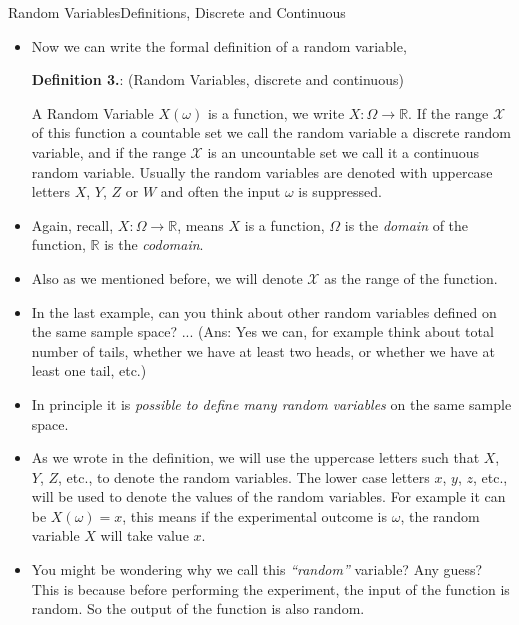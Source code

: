 \documentclass[8pt, usepdftitle=false]{beamer}
\newcounter{mytheorem}
\renewcommand{\themytheorem}{3.\arabic{mytheorem}}
\newcommand{\Thm}[1]{\refstepcounter{mytheorem}\textbf{#1\color{blue}\themytheorem}:}
\begin{document}
\begin{frame}[allowframebreaks]{Random Variables}{Definitions, Discrete and Continuous}
\begin{itemize}
\item Now we can write the formal definition of a random variable,

\begin{varblock}{\Thm{Definition } (Random Variables, discrete and continuous)}

A Random Variable $X(\omega)$ is a function, we write $X:\Omega \to \mathbb{R}$. If the range $\mathcal{X}$ of this function a countable set we call the random variable \alert{a discrete random variable}, and if the range $\mathcal{X}$ is an uncountable set we call it \alert{a continuous random variable}. Usually the random variables are denoted with uppercase letters $X$, $Y$, $Z$ or $W$ and often the input $\omega$ is  suppressed. 
\end{varblock}



\item Again, recall, $X: \Omega \to \mathbb{R}$, means $X$ is a function, $\Omega$ is the \emph{domain} of the function, $\mathbb{R}$ is the \emph{codomain}. 

\item Also as we mentioned before, we will denote $\mathcal{X}$ as the range of the function. 


\framebreak

\item In the last example, can you think about other random variables defined on the same sample space? ... (Ans: Yes we can, for example think about total number of tails, whether we have at least two heads, or whether we have at least one tail, etc.)


\item In principle it is \emph{possible to define many random variables} on the same sample space.

\item As we wrote in the definition, we will use the uppercase letters such that $X$, $Y$, $Z$, etc., to denote the random variables. The lower case letters $x$, $y$, $z$, etc., will be used to denote the values of the random variables. For example it can be $X(\omega) = x$, this means if the experimental outcome is $\omega$, the random variable $X$ will take value $x$.

\item You might be wondering why we call this \emph{``random''} variable? Any guess? This is because before performing the experiment, the \alert{input of the function is random}. So the \alert{output of the function is also random}. 



\end{itemize}
\end{frame}
\end{document}
